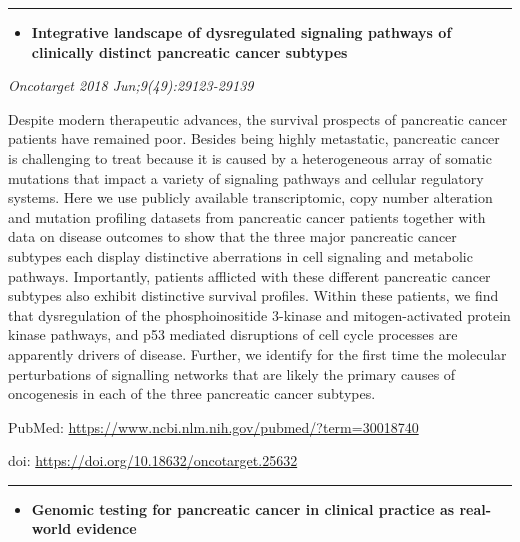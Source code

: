 \documentclass[]{article}
\providecommand{\tightlist}{%
  \setlength{\itemsep}{0pt}\setlength{\parskip}{0pt}}
\begin{document}
{}

{}

\begin{center}\rule{0.5\linewidth}{\linethickness}\end{center}

\begin{itemize}
\tightlist
\item
  \textbf{Integrative landscape of dysregulated signaling pathways of
  clinically distinct pancreatic cancer subtypes}
\end{itemize}

\emph{Oncotarget 2018 Jun;9(49):29123-29139}

Despite modern therapeutic advances, the survival prospects of
pancreatic cancer patients have remained poor. Besides being highly
metastatic, pancreatic cancer is challenging to treat because it is
caused by a heterogeneous array of somatic mutations that impact a
variety of signaling pathways and cellular regulatory systems. Here we
use publicly available transcriptomic, copy number alteration and
mutation profiling datasets from pancreatic cancer patients together
with data on disease outcomes to show that the three major pancreatic
cancer subtypes each display distinctive aberrations in cell signaling
and metabolic pathways. Importantly, patients afflicted with these
different pancreatic cancer subtypes also exhibit distinctive survival
profiles. Within these patients, we find that dysregulation of the
phosphoinositide 3-kinase and mitogen-activated protein kinase pathways,
and p53 mediated disruptions of cell cycle processes are apparently
drivers of disease. Further, we identify for the first time the
molecular perturbations of signalling networks that are likely the
primary causes of oncogenesis in each of the three pancreatic cancer
subtypes.

PubMed: \url{https://www.ncbi.nlm.nih.gov/pubmed/?term=30018740}

doi: \url{https://doi.org/10.18632/oncotarget.25632}

{}

{}

\begin{center}\rule{0.5\linewidth}{\linethickness}\end{center}

\begin{itemize}
\tightlist
\item
  \textbf{Genomic testing for pancreatic cancer in clinical practice as
  real-world evidence}
\end{itemize}
\end{document}
